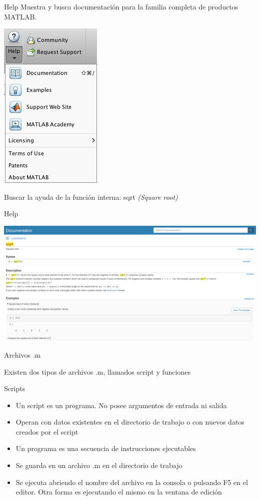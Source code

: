 \documentclass{bredelebeamer}
\begin{document}
\begin{frame}{Help}
Muestra y busca documentación para la familia completa de productos MATLAB.
\begin{center}
\includegraphics[scale=0.3]{images/pantalla6.png}
\end{center}
Buscar la ayuda de la función interna: sqrt \textit{(Square root)}
\end{frame}

\begin{frame}{Help}
\begin{center}
\includegraphics[scale=0.2]{images/pantalla7.png}
\end{center}
\end{frame}


\begin{frame}{Archivos .m}
\begin{center}
Existen dos tipos de archivos .m, llamados script y funciones
\end{center}
\end{frame}

\begin{frame}{Scripts}
\begin{itemize}
\item Un script es un programa. No posee argumentos de entrada ni salida
\item Operan con datos existentes en el directorio de trabajo o con nuevos datos creados por el script
\item Un programa es una secuencia de instrucciones ejecutables
\item Se guarda en un archivo .m en el directorio de trabajo
\item Se ejecuta abriendo el nombre del archivo en la consola o pulsando F5 en el editor. Otra forma es ejecutando el mismo en la ventana de edición
\end{itemize}
\end{frame}
\end{document}
